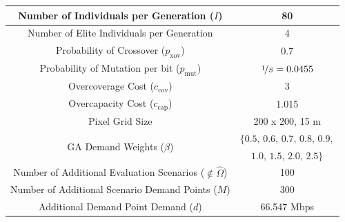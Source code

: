 \documentclass[12pt,dvipsnames]{report}
\begin{document}
\begin{table}[p]
\begin{tabular}{|c|c|}
		\hline 
		Number of Individuals per Generation ($I$) & 80 \\ 
		\hline
		Number of Elite Individuals per Generation & 4 \\
		\hline 
		Probability of Crossover ($p_\text{xov}$) & 0.7 \\ 
		\hline
		Probability of Mutation per bit ($p_\text{mut}$) & $\nicefrac{1}{S} = 0.0455$ \\
		\hline 
		Overcoverage Cost ($c_\text{cov}$) & 3 \\
		\hline
		Overcapacity Cost ($c_\text{cap}$) & 1.015 \\ 
		\hline
		Pixel Grid Size & 200 x 200, 15 m \\ 
		\hline
		\multirow{2}{*}{GA Demand Weights ($\beta$)} & $\{ 0.5,\, 0.6,\, 0.7,\, 0.8,\, 0.9,$ \\
		& $1.0,\, 1.5,\, 2.0,\, 2.5 \}$ \\
		\hline
		\hline
		Number of Additional Evaluation Scenarios ($\not\in \hat{\Omega}$) & 100 \\
		\hline
		Number of Additional Scenario Demand Points ($M$) & 300 \\
		\hline
		Additional Demand Point Demand ($d$) & 66.547 Mbps \\
		\hline
	\end{tabular}
	\label{tab:CaseII_SimVal}
\end{table}
\end{document}
